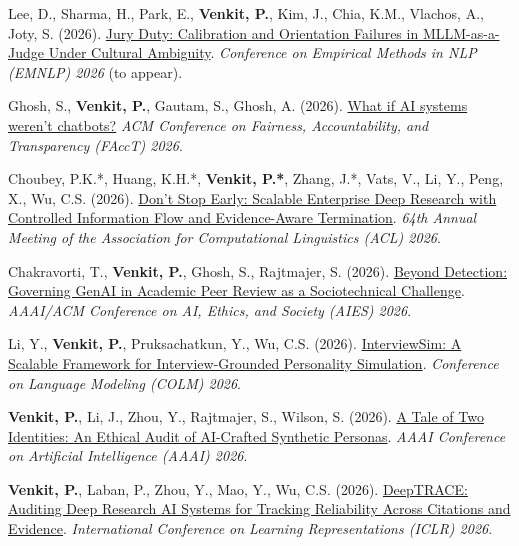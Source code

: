 
{\paragraphstyle
{}
\vspace{3mm}\begin{cvitems}
  \item {Lee, D., Sharma, H., Park, E., \textbf{Venkit, P.}, Kim, J., Chia, K.M., Vlachos, A., Joty, S. (2026). \href{https://arxiv.org/abs/2606.20676}{Jury Duty: Calibration and Orientation Failures in MLLM-as-a-Judge Under Cultural Ambiguity}. \textit{Conference on Empirical Methods in NLP (EMNLP) 2026} (to appear).}
  \item {Ghosh, S., \textbf{Venkit, P.}, Gautam, S., Ghosh, A. (2026). \href{https://dl.acm.org/doi/abs/10.1145/3805689.3812232}{What if AI systems weren’t chatbots?} \textit{ACM Conference on Fairness, Accountability, and Transparency (FAccT) 2026}.}
  \item {Choubey, P.K.*, Huang, K.H.*, \textbf{Venkit, P.*}, Zhang, J.*, Vats, V., Li, Y., Peng, X., Wu, C.S. (2026). \href{https://aclanthology.org/2026.acl-industry.116/}{Don’t Stop Early: Scalable Enterprise Deep Research with Controlled Information Flow and Evidence-Aware Termination}. \textit{64th Annual Meeting of the Association for Computational Linguistics (ACL) 2026}.}
  \item {Chakravorti, T., \textbf{Venkit, P.}, Ghosh, S., Rajtmajer, S. (2026). \href{https://arxiv.org/abs/2603.20214}{Beyond Detection: Governing GenAI in Academic Peer Review as a Sociotechnical Challenge}. \textit{AAAI/ACM Conference on AI, Ethics, and Society (AIES) 2026}.}
  \item {Li, Y., \textbf{Venkit, P.}, Pruksachatkun, Y., Wu, C.S. (2026). \href{https://arxiv.org/abs/2602.20294}{InterviewSim: A Scalable Framework for Interview-Grounded Personality Simulation}. \textit{Conference on Language Modeling (COLM) 2026}.}
  \item {\textbf{Venkit, P.}, Li, J., Zhou, Y., Rajtmajer, S., Wilson, S. (2026). \href{https://ojs.aaai.org/index.php/AAAI/article/view/41112}{A Tale of Two Identities: An Ethical Audit of AI-Crafted Synthetic Personas}. \textit{AAAI Conference on Artificial Intelligence (AAAI) 2026}.}
  \item {\textbf{Venkit, P.}, Laban, P., Zhou, Y., Mao, Y., Wu, C.S. (2026). \href{https://arxiv.org/abs/2509.04499}{DeepTRACE: Auditing Deep Research AI Systems for Tracking Reliability Across Citations and Evidence}. \textit{International Conference on Learning Representations (ICLR) 2026}.}

\end{cvitems}}
